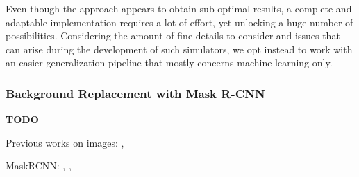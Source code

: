 Even though the approach appears to obtain sub-optimal results, a complete and adaptable implementation requires a lot of effort, yet unlocking a huge number of possibilities. Considering the amount of fine details to consider and issues that can arise during the development of such simulators, we opt instead to work with an easier generalization pipeline that mostly concerns machine learning only.


\subsubsection{Background Replacement with Mask R-CNN}
\label{subsec:sota-maskrcnn}

\textbf{TODO}

Previous works on images: \cite{yue2019domain}, \cite{Takahashi_2020}

MaskRCNN: \cite{he2018mask}, \cite{maskrcnn_explanation}, \cite{maskrcnn_arcgis}



